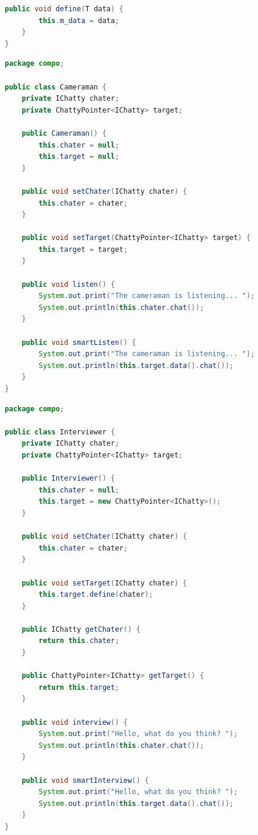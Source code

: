 \documentclass[11pt,a4paper,openany,oneside]{book}
\begin{document}
\begin{appendices}
\begin{lstlisting}[language=Java, frame=single, caption=ChattyPointer]
    public void define(T data) {
        this.m_data = data;
    }
}
\end{lstlisting}

\clearpage

\begin{lstlisting}[language=Java, frame=single, caption=Cameraman]
package compo;

public class Cameraman {
    private IChatty chater;
    private ChattyPointer<IChatty> target;

    public Cameraman() {
        this.chater = null;
        this.target = null;
    }

    public void setChater(IChatty chater) {
        this.chater = chater;
    }

    public void setTarget(ChattyPointer<IChatty> target) {
        this.target = target;
    }

    public void listen() {
        System.out.print("The cameraman is listening... ");
        System.out.println(this.chater.chat());
    }

    public void smartListen() {
        System.out.print("The cameraman is listening... ");
        System.out.println(this.target.data().chat());
    }
}
\end{lstlisting}

\clearpage

\begin{lstlisting}[language=Java, frame=single, caption=Interviewer]
package compo;

public class Interviewer {
    private IChatty chater;
    private ChattyPointer<IChatty> target;

    public Interviewer() {
        this.chater = null;
        this.target = new ChattyPointer<IChatty>();
    }

    public void setChater(IChatty chater) {
        this.chater = chater;
    }

    public void setTarget(IChatty chater) {
        this.target.define(chater);
    }

    public IChatty getChater() {
        return this.chater;
    }

    public ChattyPointer<IChatty> getTarget() {
        return this.target;
    }

    public void interview() {
        System.out.print("Hello, what do you think? ");
        System.out.println(this.chater.chat());
    }

    public void smartInterview() {
        System.out.print("Hello, what do you think? ");
        System.out.println(this.target.data().chat());
    }
}
\end{lstlisting}


\end{appendices}
\end{document}

